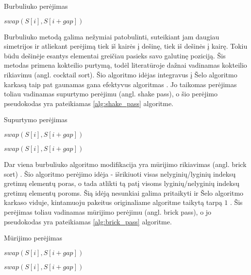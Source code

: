 \documentclass{VUMIFInfBakalaurinis}
\begin{document}
\begin{algorithm}[H]
  \caption{Burbuliuko perėjimas}\label{alg:bubble_pass}
  \begin{algorithmic}[1]
        \State $swap(S[i], S[i+gap])$
      \EndIf
    \EndFor
  \end{algorithmic}
\end{algorithm}

Burbuliuko metodą galima nežymiai patobulinti, suteikiant jam daugiau simetrijos ir atliekant perėjimą
tiek iš kairės į dešinę, tiek iš dešinės į kairę.
Tokiu būdu dešinėje esantys elementai greičiau pasieks savo galutinę poziciją.
Šis metodas primena kokteilio purtymą, todėl literatūroje dažnai vadinamas kokteilio rikiavimu (angl. cocktail sort).
Šio algoritmo idėjas integravus į Šelo algoritmo karkasą taip pat gaunamas gana efektyvus algoritmas \cite{incerpi1986practical}.
Jo taikomas perėjimas toliau vadinamas supurtymo perėjimu (angl. shake pass), o šio perėjimo pseudokodas yra pateikiamas \ref{alg:shake_pass} algoritme.

\begin{algorithm}[H]
  \caption{Supurtymo perėjimas}\label{alg:shake_pass}
  \begin{algorithmic}[1]
        \State $swap(S[i], S[i+gap])$
      \EndIf
    \EndFor

        \State $swap(S[i], S[i+gap])$
      \EndIf
    \EndFor
  \end{algorithmic}
\end{algorithm}

\pagebreak

Dar viena burbuliuko algoritmo modifikacija yra mūrijimo rikiavimas (angl. brick sort) \cite{habermann1972parallel}.
Šio algoritmo perėjimo idėja - išrikiuoti visas nelyginių/lyginių indeksų gretimų elementų poras,
o tada atlikti tą patį visoms lyginių/nelyginių indeksų gretimų elementų poroms.
Šią idėją nesunkiai galima pritaikyti ir Šelo algoritmo karkaso viduje, kintamuoju pakeitus originaliame algoritme taikytą tarpą $1$ \cite{lemke1994performance}.
Šis perėjimas toliau vadinamas mūrijimo perėjimu (angl. brick pass), o jo pseudokodas yra pateikiamas \ref{alg:brick_pass} algoritme.

\begin{algorithm}[H]
  \caption{Mūrijimo perėjimas}\label{alg:brick_pass}
  \begin{algorithmic}[1]
        \State $swap(S[i], S[i+gap])$
      \EndIf
    \EndFor

        \State $swap(S[i], S[i+gap])$
      \EndIf
    \EndFor
  \end{algorithmic}
\end{algorithm}
\end{document}
